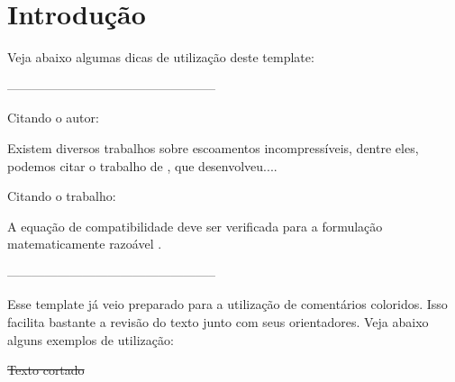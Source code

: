 \chapter*{Introdução}



Veja abaixo algumas dicas de utilização deste template:

--------------------------------------------------



Citando o autor:

Existem diversos trabalhos sobre escoamentos incompressíveis, dentre eles, podemos citar o trabalho de , que desenvolveu....


Citando o trabalho:

A equação de compatibilidade deve ser verificada para a formulação matematicamente razoável \cite{Guermond:2003}. 


--------------------------------------------------

Esse template já veio preparado para a utilização de comentários coloridos. Isso facilita bastante a revisão do texto junto com seus orientadores. Veja abaixo alguns exemplos de utilização:









\sout{Texto cortado}

